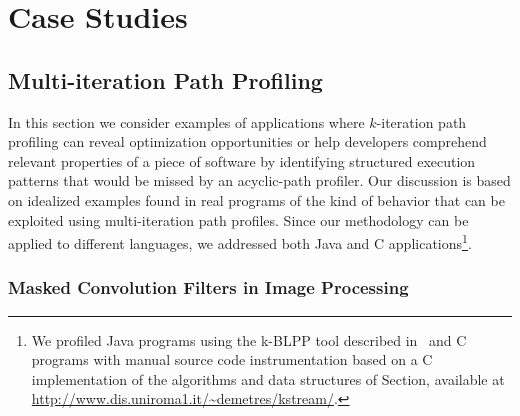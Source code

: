\chapter{Case Studies}
\label{ch:case-studies}

\missing

\section{Multi-iteration Path Profiling}
\label{se:kblpp-case-studies}
In this section we consider examples of applications where $k$-iteration path profiling can reveal optimization opportunities or help developers comprehend relevant properties of a piece of software by identifying structured execution patterns that would be missed by an acyclic-path profiler. Our discussion is based on idealized examples found in real programs of the kind of behavior that can be exploited using multi-iteration path profiles. Since our methodology can be applied to different languages, we addressed both Java and C applications\footnote{We profiled Java programs using the k-BLPP tool described in \missing\ and C programs with manual source code instrumentation based on a C implementation of the algorithms and data structures of Section\missing, available at \url{http://www.dis.uniroma1.it/~demetres/kstream/}. }.

\subsection{Masked Convolution Filters in Image Processing}
\label{ss:convolution}

